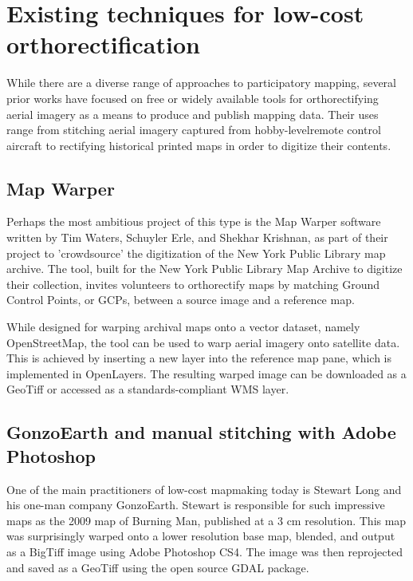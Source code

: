 \documentclass[11pt]{report}
\begin{document}
\section{Existing techniques for low-cost orthorectification}
\label{sec:existingtechniques}

While there are a diverse range of approaches to participatory mapping, several prior works have focused on free or widely available tools for orthorectifying aerial imagery as a means to produce and publish mapping data. Their uses range from stitching aerial imagery captured from hobby-levelremote control aircraft to rectifying historical printed maps in order to digitize their contents.

\subsection{Map Warper}
\label{subsec:mapwarper}

Perhaps the most ambitious project of this type is the Map Warper software written by Tim Waters, Schuyler Erle, and Shekhar Krishnan, as part of their project to 'crowdsource' the digitization of the New York Public Library map archive. \cite{waters2009warper} The tool, built for the New York Public Library Map Archive to digitize their collection, invites volunteers to orthorectify maps by matching Ground Control Points, or GCPs, between a source image and a reference map. 

While designed for warping archival maps onto a vector dataset, namely OpenStreetMap, the tool can be used to warp aerial imagery onto satellite data. This is achieved by inserting a new layer into the reference map pane, which is implemented in OpenLayers. The resulting warped image can be downloaded as a GeoTiff or accessed as a standards-compliant WMS layer. 

\subsection{GonzoEarth and manual stitching with Adobe Photoshop}
\label{subsec:gonzoearth}
One of the main practitioners of low-cost mapmaking today is Stewart Long and his one-man company GonzoEarth. Stewart is responsible for such impressive maps as the 2009 map of Burning Man, published at a 3 cm resolution. This map was surprisingly warped onto a lower resolution base map, blended, and output as a BigTiff image using Adobe Photoshop CS4. The image was then reprojected and saved as a GeoTiff using the open source GDAL package.
\end{document}
